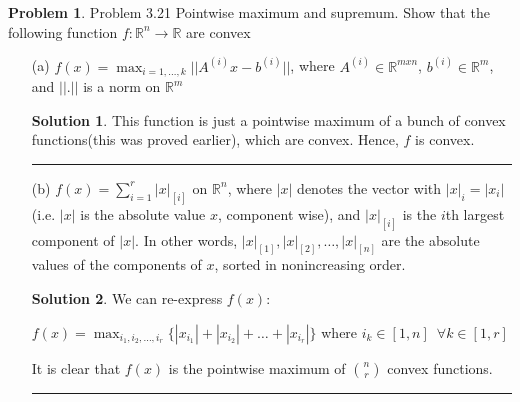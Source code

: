 \documentclass{article}
\theoremstyle{definition}
\newtheorem{problem}{Problem}
\def\fline{\rule{0.75\linewidth}{0.5pt}}
\newcommand{\finishline}{\begin{center}\fline\end{center}}
\newtheorem*{solution*}{Solution}
\newenvironment{solution}{\begin{solution*}}{{\finishline} \end{solution*}}
\begin{document}
\begin{problem} Problem 3.21
    {Pointwise maximum and supremum.} Show that the following function $f: \mathbb{R}^n \rightarrow \mathbb{R}$ are convex

    \begin{itemize}
        \item[(a)] $f(x) = \max_{i = 1, \dots, k} || A^{(i)}x - b^{(i)}||$, where $A^{(i)} \in \mathbb{R}^{m x n}$, $b^{(i)} \in \mathbb{R}^m$, and $||.||$ is a norm on $\mathbb{R}^m$

        \begin{solution}
            This function is just a pointwise maximum of a bunch of convex functions(this was proved earlier), which are convex. Hence, $f$ is convex. 
        \end{solution}

        \item[(b)] $f(x) = \sum_{i=1}^{r} |x|_{[i]}$ on $\mathbb{R}^n$, where $|x|$ denotes the vector with $|x|_i = |x_i|$ (i.e. $|x|$ is the absolute value $x$, component wise), and $|x|_{[i]}$ is the $i$th largest component of $|x|$.  In other words,  $|x|_{[1]}, |x|_{[2]}, \dots , |x|_{[n]}$ are the absolute values of the components of $x$, sorted in nonincreasing order.

        \begin{solution}
            We can re-express $f(x)$: \newline 

            $f(x) = \max_{i_1, i_2, \dots, i_r} \{|x_{i_1}| + |x_{i_2}| + \dots + |x_{i_r}|\}$ where $i_k \in [1, n] \enspace \forall k \in [1, r]$ \newline 

            It is clear that $f(x)$ is the pointwise maximum of $\binom{n}{r}$ convex functions. 

            
        \end{solution}
    \end{itemize}
\end{problem}
\end{document}
